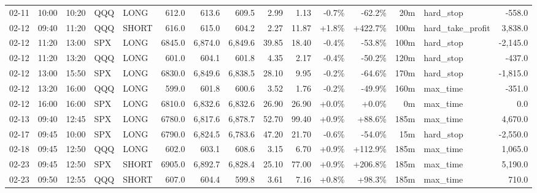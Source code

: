 \documentclass[11pt,a4paper,twoside]{article}
\begin{document}
\begin{landscape}
\begin{center}
\begin{longtable}{>{\color{txtmain}}l l l l l r r r r r r r r >{\color{txtmain}}l r}
02-11 & 10:00 & 10:20 & QQQ & LONG & 612.0 & 613.6 & 609.5 & 2.99 & 1.13 & \textcolor{lossred}{-0.7\%} & \textcolor{lossred}{-62.2\%} & 20m & hard\_stop & \textcolor{lossred}{-558.0} \\
02-12 & 09:40 & 11:20 & QQQ & SHORT & 616.0 & 615.0 & 604.2 & 2.27 & 11.87 & \textcolor{wingreen}{+1.8\%} & \textcolor{wingreen}{+422.7\%} & 100m & hard\_take\_profit & \textcolor{wingreen}{3,838.0} \\
02-12 & 11:20 & 13:00 & SPX & LONG & 6845.0 & 6,874.0 & 6,849.6 & 39.85 & 18.40 & \textcolor{lossred}{-0.4\%} & \textcolor{lossred}{-53.8\%} & 100m & hard\_stop & \textcolor{lossred}{-2,145.0} \\
02-12 & 11:20 & 13:20 & QQQ & LONG & 601.0 & 604.1 & 601.8 & 4.35 & 2.17 & \textcolor{lossred}{-0.4\%} & \textcolor{lossred}{-50.2\%} & 120m & hard\_stop & \textcolor{lossred}{-437.0} \\
02-12 & 13:00 & 15:50 & SPX & LONG & 6830.0 & 6,849.6 & 6,838.5 & 28.10 & 9.95 & \textcolor{lossred}{-0.2\%} & \textcolor{lossred}{-64.6\%} & 170m & hard\_stop & \textcolor{lossred}{-1,815.0} \\
02-12 & 13:20 & 16:00 & QQQ & LONG & 599.0 & 601.8 & 600.6 & 3.52 & 1.76 & \textcolor{lossred}{-0.2\%} & \textcolor{lossred}{-49.9\%} & 160m & max\_time & \textcolor{lossred}{-351.0} \\
02-12 & 16:00 & 16:00 & SPX & LONG & 6810.0 & 6,832.6 & 6,832.6 & 26.90 & 26.90 & \textcolor{wingreen}{+0.0\%} & \textcolor{wingreen}{+0.0\%} & 0m & max\_time & \textcolor{wingreen}{0.0} \\
02-13 & 09:40 & 12:45 & SPX & LONG & 6780.0 & 6,817.6 & 6,878.7 & 52.70 & 99.40 & \textcolor{wingreen}{+0.9\%} & \textcolor{wingreen}{+88.6\%} & 185m & max\_time & \textcolor{wingreen}{4,670.0} \\
02-17 & 09:45 & 10:00 & SPX & LONG & 6790.0 & 6,824.5 & 6,783.6 & 47.20 & 21.70 & \textcolor{lossred}{-0.6\%} & \textcolor{lossred}{-54.0\%} & 15m & hard\_stop & \textcolor{lossred}{-2,550.0} \\
02-18 & 09:45 & 12:50 & QQQ & LONG & 602.0 & 603.1 & 608.6 & 3.15 & 6.70 & \textcolor{wingreen}{+0.9\%} & \textcolor{wingreen}{+112.9\%} & 185m & max\_time & \textcolor{wingreen}{1,065.0} \\
02-23 & 09:45 & 12:50 & SPX & SHORT & 6905.0 & 6,892.7 & 6,828.4 & 25.10 & 77.00 & \textcolor{wingreen}{+0.9\%} & \textcolor{wingreen}{+206.8\%} & 185m & max\_time & \textcolor{wingreen}{5,190.0} \\
02-23 & 09:50 & 12:55 & QQQ & SHORT & 607.0 & 604.4 & 599.8 & 3.61 & 7.16 & \textcolor{wingreen}{+0.8\%} & \textcolor{wingreen}{+98.3\%} & 185m & max\_time & \textcolor{wingreen}{710.0} \\

\end{longtable}
\end{center}
\end{landscape}
\end{document}
